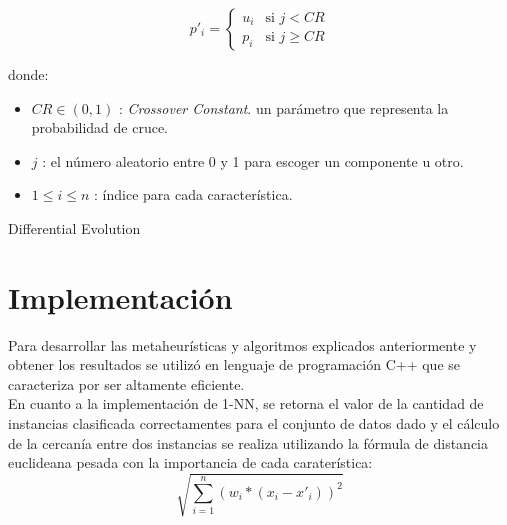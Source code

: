 \documentclass{ci5652}
\begin{document}
\[
p'_i = 
  \begin{cases}
    u_i & \text{si } j < CR\\
    p_i & \text{si } j \geq CR 
  \end{cases} 
\]

donde: 
\begin{itemize}
  \item $CR \in (0,1)$ : \textit{Crossover Constant}. un parámetro que
  representa la probabilidad de cruce.
  \item $j$ : el número aleatorio entre 0 y 1 para escoger un componente u otro.
  \item $1 \leq i \leq n $ : índice para cada característica.
\end{itemize}

\begin{algorithm}
 \DontPrintSemicolon
 \vspace*{0.1cm}
 \vspace*{0.1cm}
 \caption{Differential Evolution}
\end{algorithm}


\section{Implementación}

Para desarrollar las metaheurísticas y algoritmos explicados anteriormente y 
obtener los resultados se utilizó en lenguaje de programación C++ que se 
caracteriza por ser altamente eficiente.\\

En cuanto a la implementación de 1-NN, se retorna el valor de la cantidad de 
instancias clasificada correctamentes para el conjunto de datos dado y el 
cálculo de la cercanía entre dos instancias se realiza utilizando la fórmula de
distancia euclideana pesada con la importancia de cada caraterística: 
$$\sqrt{\sum_{i=1}^n (w_i * (x_i - x'_i))^{2}}$$
\end{document}

